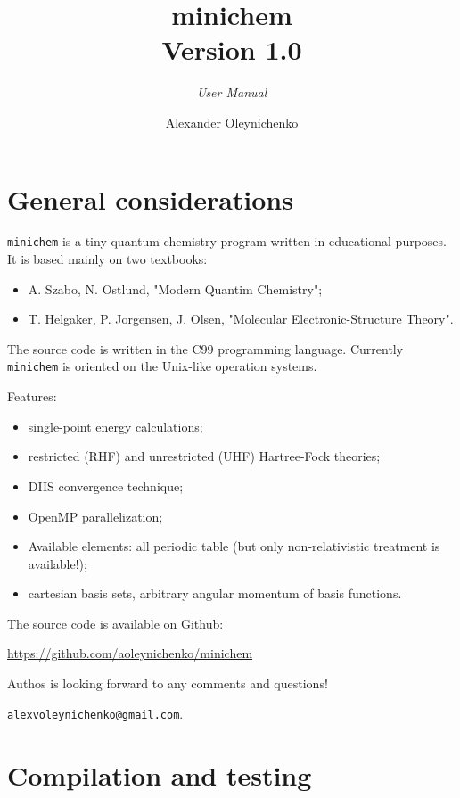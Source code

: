 \documentclass[a4paper, 12pt]{article}
\title{{\bf minichem} \\ \bigskip \normalsize Version 1.0 }
\author{Alexander Oleynichenko}
\subtitle{\textit{User Manual}}
\begin{document}
\maketitle

\tableofcontents

\section{General considerations}

\texttt{minichem} is a tiny quantum chemistry program written in educational purposes. It is based mainly on two textbooks:

\begin{itemize}
\item \cite{szabo1996} A. Szabo, N. Ostlund, "Modern Quantim Chemistry";
\item \cite{helgaker2008} T. Helgaker, P. Jorgensen, J. Olsen, "Molecular Electronic-Structure Theory".
\end{itemize}

The source code is written in the C99 programming language. Currently \texttt{minichem} is oriented on the Unix-like operation systems.

Features:

\begin{itemize}
\item single-point energy calculations;
\item restricted (RHF) and unrestricted (UHF) Hartree-Fock theories;
\item DIIS convergence technique;
\item OpenMP parallelization;
\item Available elements: all periodic table (but only non-relativistic treatment is available!);
\item cartesian basis sets, arbitrary angular momentum of basis functions.
\end{itemize}

The source code is available on Github:

\url{https://github.com/aoleynichenko/minichem}

\bigskip

Authos is looking forward to any comments and questions!

\href{mailto:alexvoleynichenko@gmail.com}{\nolinkurl{alexvoleynichenko@gmail.com}}.


\section{Compilation and testing}
\end{document}
